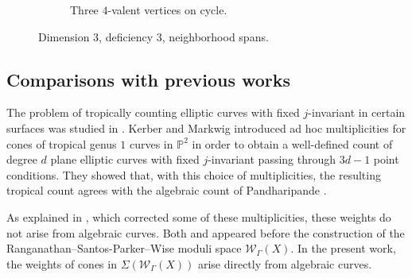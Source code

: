 \documentclass{article}
\begin{document}
\begin{figure}[h]
\begin{subfigure}[t]{0.3\textwidth}
        \caption{Three $4$-valent vertices on cycle.}
      \end{subfigure}
        
      \caption{Dimension 3, deficiency 3, neighborhood spans.}
    \label{fig: dim3 nbhd spans}
\end{figure}



\subsection{Comparisons with previous works}

The problem of tropically counting elliptic curves with fixed $j$-invariant in certain surfaces was studied in \cite{KM09,LR18}. Kerber and Markwig introduced ad hoc multiplicities for cones of tropical genus $1$ curves in $\mathbb{P}^2$ in order to obtain a well-defined count of degree $d$ plane elliptic curves with fixed $j$-invariant passing through $3d-1$ point conditions. They showed that, with this choice of multiplicities, the resulting tropical count agrees with the algebraic count of Pandharipande \cite{Pandh97}.

As explained in \cite{LR18}, which corrected some of these multiplicities, these weights do not arise from algebraic curves. Both \cite{KM09} and \cite{LR18} appeared before the construction of the Ranganathan--Santos-Parker--Wise moduli space $\mathcal{W}_{\Gamma}(X)$. In the present work, the weights of cones in $\Sigma(\mathcal{W}_{\Gamma}(X))$ arise directly from algebraic curves.
\end{document}
